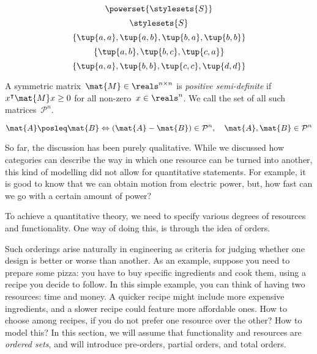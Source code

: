 {\begin{forslides}
\begin{equation*}
        \label{eq:pow_6}
        \powerset{\stylesets{S}}
\end{equation*}
    \begin{equation*}
        \label{eq:pow_7}
        \stylesets{S}
\end{equation*}
    \begin{equation*}
        \label{eq:pre_ex1}
        \{\tup{a,a},\tup{a,b},\tup{b,a},\tup{b,b}\}
\end{equation*}
        \begin{equation*}
        \label{eq:pre_ex2}
        \{\tup{a,b},\tup{b,c},\tup{c,a}\}
\end{equation*}
            \begin{equation*}
        \label{eq:pre_ex3}
        \{\tup{a,a},\tup{b,b},\tup{c,c},\tup{d,d}\}
\end{equation*}
    \begin{definition}
        \label{def:posdef}
        A symmetric matrix~$\mat{M}\in \reals^{n\times n}$ is \emph{positive semi-definite} if~$x^\intercal \mat{M}x\geq 0$ for all non-zero~$x\in \reals^n$. We call the set of all such matrices~$\mathcal{P}^n$.
\end{definition}
    \begin{equation*}
        \label{eq:posdef_1}
        \mat{A}\posleq \mat{B} \Leftrightarrow (\mat{A}-\mat{B})\in \mathcal{P}^n, \quad \mat{A},\mat{B}\in \mathcal{P}^n
\end{equation*}
\end{forslides}}


So far, the discussion has been purely qualitative. While we discussed how
categories can describe the way in which one resource can be turned into another,
this kind of modelling did not allow for quantitative statements. For example, it
is good to know that we can obtain motion from electric power, but, how fast can
we go with a certain amount of power?

To achieve a quantitative theory, we need to specify various degrees of resources and functionality.
One way of doing this, is through the idea of orders.


Such orderings arise naturally in engineering as criteria for judging whether one design is better or worse than another.
As an example, suppose you need to prepare some pizza: you have to buy specific ingredients and cook them, using a recipe you decide to follow.
In this simple example, you can think of having two resources: time and money.
A quicker recipe might include more expensive ingredients, and a slower recipe could feature more affordable ones.
How to choose among recipes, if you do not prefer one resource over the other? How to model this? In this section, we will assume that functionality and resources
are \emph{ordered sets}, and will introduce pre-orders, partial orders, and total orders.


